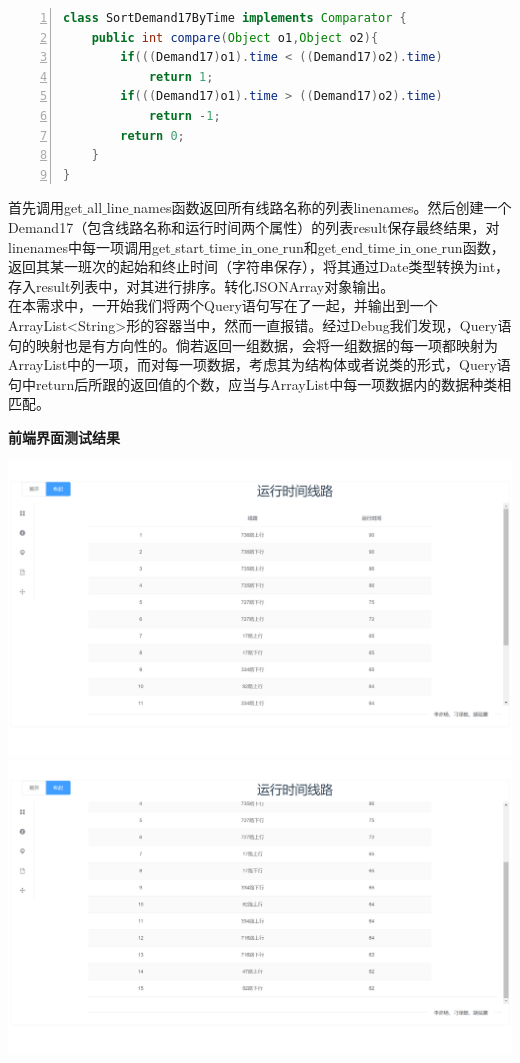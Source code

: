 \documentclass[11pt,a4paper]{article}
\begin{document}
\begin{lstlisting}[numbers = left, 
showstringspaces=false,
showspaces = false,
breaklines = true, 
language=Java]
class SortDemand17ByTime implements Comparator {
    public int compare(Object o1,Object o2){
        if(((Demand17)o1).time < ((Demand17)o2).time)
            return 1;
        if(((Demand17)o1).time > ((Demand17)o2).time)
            return -1;
        return 0;
    }
}
\end{lstlisting} 
首先调用get$\_$all$\_$line$\_$names函数返回所有线路名称的列表linenames。然后创建一个Demand17（包含线路名称和运行时间两个属性）的列表result保存最终结果，对linenames中每一项调用get$\_$start$\_$time$\_$in$\_$one$\_$run和get$\_$end$\_$time$\_$in$\_$one$\_$run函数，返回其某一班次的起始和终止时间（字符串保存），将其通过Date类型转换为int，存入result列表中，对其进行排序。转化JSONArray对象输出。 \\
在本需求中，一开始我们将两个Query语句写在了一起，并输出到一个ArrayList<String>形的容器当中，然而一直报错。经过Debug我们发现，Query语句的映射也是有方向性的。倘若返回一组数据，会将一组数据的每一项都映射为ArrayList中的一项，而对每一项数据，考虑其为结构体或者说类的形式，Query语句中return后所跟的返回值的个数，应当与ArrayList中每一项数据内的数据种类相匹配。

\textbf{前端界面测试结果} \\
\begin{center}
\centering
\includegraphics[scale=0.3]{./assets/demand17_1.png} \\ 
\includegraphics[scale=0.3]{./assets/demand17_2.png} 
\end{center}
\end{document}
